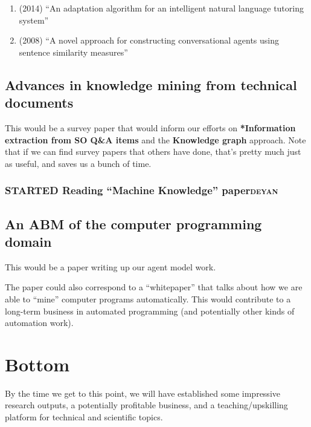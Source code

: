 \documentclass[11pt]{article}
\begin{document}
\begin{enumerate}
\item (2014) ``An adaptation algorithm for an intelligent natural language tutoring system''
\item (2008) ``A novel approach for constructing conversational agents using sentence similarity measures''
\end{enumerate}
\subsection{Advances in knowledge mining from technical documents}
\label{sec:orga2df2af}
This would be a survey paper that would inform our efforts on
\textbf{*Information extraction from SO Q\&A items} and the \textbf{Knowledge graph}
approach.  Note that if we can find survey papers that others have
done, that’s pretty much just as useful, and saves us a bunch of time.

\subsubsection{{\bfseries\sffamily STARTED} Reading ``Machine Knowledge'' paper\hfill{}\textsc{deyan}}
\label{sec:org526293c}
\subsection{An ABM of the computer programming domain}
\label{sec:org94b067d}
This would be a paper writing up our agent model work.

The paper could also correspond to a “whitepaper” that talks about how
we are able to “mine” computer programs automatically.  This would
contribute to a long-term business in automated programming (and
potentially other kinds of automation work).
\section{Bottom}
\label{sec:orga7c6d9e}
By the time we get to this point, we will have established some
impressive research outputs, a potentially profitable business, and a
teaching/upskilling platform for technical and scientific topics.
\end{document}
